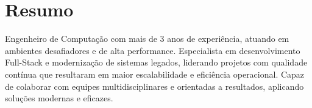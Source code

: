 \section{Resumo}
	Engenheiro de Computação com mais de 3 anos de experiência, atuando em ambientes desafiadores e de alta performance. Especialista em desenvolvimento Full-Stack e modernização de sistemas legados, liderando projetos com qualidade contínua que resultaram em maior escalabilidade e eficiência operacional. Capaz de colaborar com equipes multidisciplinares e orientadas a resultados, aplicando soluções modernas e eficazes.